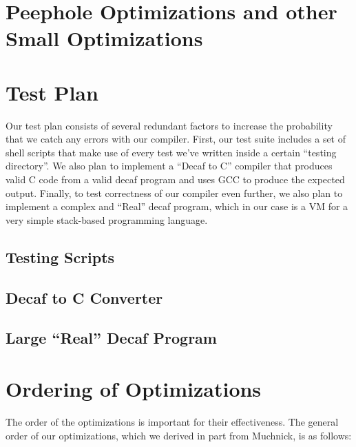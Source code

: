 \documentclass[11pt]{article}
\begin{document}
\section {Peephole Optimizations and other Small Optimizations}
\label{sec:peephole}

\section {Test Plan}
\label{sec:test}

Our test plan consists of several redundant factors to increase the
probability that we catch any errors with our compiler. First, our
test suite includes a set of shell scripts that make use of every test
we've written inside a certain ``testing directory''. We also plan to
implement a ``Decaf to C'' compiler that produces valid C code from a
valid decaf program and uses GCC to produce the expected
output. Finally, to test correctness of our compiler even further, we
also plan to implement a complex and ``Real'' decaf program, which in
our case is a VM for a very simple stack-based programming language. 

\subsection {Testing Scripts}

\subsection {Decaf to C Converter} 

\subsection {Large ``Real'' Decaf Program}


\section {Ordering of Optimizations} 
\label{sec:order}

The order of the optimizations is important for their
effectiveness. The general order of our optimizations, which we derived
in part from Muchnick, is as follows: 
\end{document}

